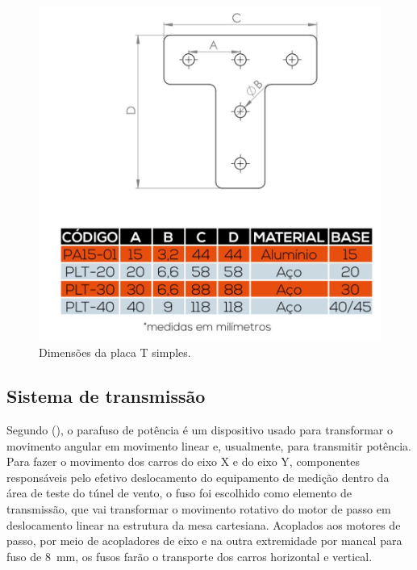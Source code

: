 \begin{figure}[H]
\centering
\caption{Dimensões da placa T simples.}\label{fig:placatd}
\includegraphics[scale = 0.3]{figuras/placatd}
\end{figure}

\subsection{Sistema de transmissão}\label{subsec:mettransmissao}

Segundo \citeauthor{budynas2016elementos} (\citeyear{budynas2016elementos}), o parafuso de potência 
é um dispositivo usado para transformar o movimento angular em movimento linear e, usualmente, 
para transmitir potência. Para fazer o movimento dos carros do eixo X e do eixo Y, 
componentes responsáveis pelo efetivo deslocamento do equipamento de medição dentro da área de 
teste do túnel de vento, o fuso foi escolhido como elemento de transmissão, que vai transformar 
o movimento rotativo do motor de passo em deslocamento linear na estrutura da mesa cartesiana. 
Acoplados aos motores de passo, por meio de acopladores de eixo e na outra extremidade por mancal para fuso 
de 8~mm, os fusos farão o transporte dos carros horizontal e vertical. 

